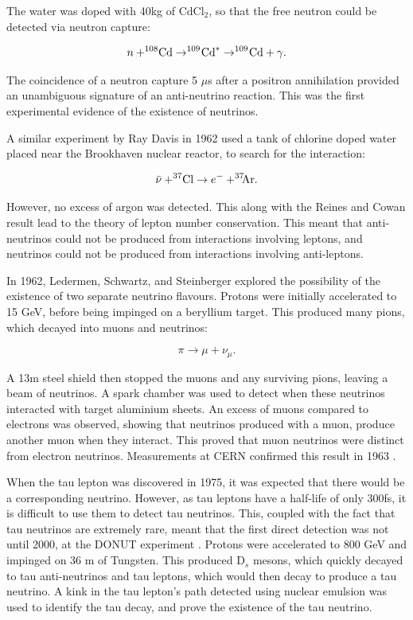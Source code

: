 The water was doped with 40kg of CdCl$_{2}$, so that the free neutron could be detected via neutron capture:

\begin{equation}
n + ^{108}\negmedspace \text{Cd} \rightarrow ^{109}\negmedspace \text{Cd}^{*} \rightarrow ^{109}\negmedspace \text{Cd} + \gamma.
\end{equation}

The coincidence of a neutron capture 5 $\mu$s after a positron annihilation provided an unambiguous signature of an anti-neutrino reaction. This was the first experimental evidence of the existence of neutrinos.

A similar experiment by Ray Davis \cite{davis} in 1962 used a tank of chlorine doped water placed near the Brookhaven nuclear reactor, to search for the interaction:

\begin{equation}
\bar{\nu} + ^{37}\negmedspace \text{Cl} \rightarrow e^- + ^{37}\negmedspace \negmedspace \text{Ar}.
\label{eqn:argonreact}
\end{equation}

However, no excess of argon was detected. This along with the Reines and Cowan result lead to the theory of lepton number conservation. This meant that anti-neutrinos could not be produced from interactions involving leptons, and neutrinos could not be produced from interactions involving anti-leptons.

In 1962, Ledermen, Schwartz, and Steinberger \cite{lederman} explored the possibility of the existence of two separate neutrino flavours. Protons were initially accelerated to 15 GeV, before being impinged on a beryllium target. This produced many pions, which decayed into muons and neutrinos:

\begin{equation}
\pi \rightarrow \mu + \nu_{\mu}.
\end{equation}

A 13m steel shield then stopped the muons and any surviving pions, leaving a beam of neutrinos. A spark chamber was used to detect when these neutrinos interacted with target aluminium sheets. An excess of muons compared to electrons was observed, showing that neutrinos produced with a muon, produce another muon when they interact. This proved that muon neutrinos were distinct from electron neutrinos. Measurements at CERN confirmed this result in 1963 \cite{cernnuflavs}.

When the tau lepton was discovered in 1975, it was expected that there would be a corresponding neutrino. However, as tau leptons have a half-life of only 300fs, it is difficult to use them to detect tau neutrinos. This, coupled with the fact that tau neutrinos are extremely rare, meant that the first direct detection was not until 2000, at the DONUT experiment \cite{taudiscovery}. Protons were accelerated to 800 GeV and impinged on 36 m of Tungsten. This produced D$_{s}$ mesons, which quickly decayed to tau anti-neutrinos and tau leptons, which would then decay to produce a tau neutrino. A kink in the tau lepton's path detected using nuclear emulsion was used to identify the tau decay, and prove the existence of the tau neutrino.

